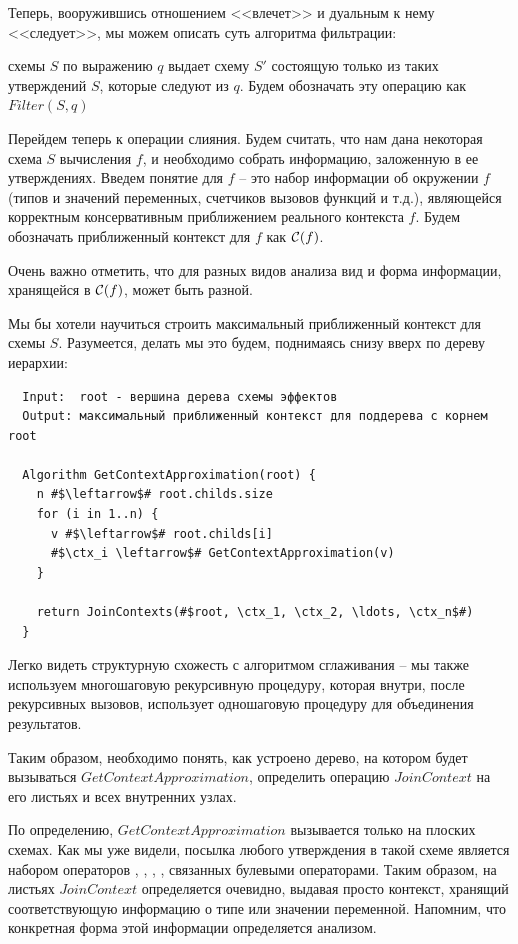 Теперь, вооружившись отношением <<влечет>> и дуальным к нему <<следует>>, мы можем описать суть алгоритма фильтрации:

\begin{definition}
     схемы $S$ по выражению $q$ выдает схему $S'$ состоящую только из таких утверждений $S$, которые следуют из $q$. Будем обозначать эту операцию как $Filter(S, q)$
\end{definition}


\bigskip

Перейдем теперь к операции слияния. Будем считать, что нам дана некоторая схема $S$ вычисления $f$, и необходимо собрать информацию, заложенную в ее утверждениях. Введем понятие  для $f$ -- это набор информации об окружении $f$ (типов и значений переменных, счетчиков вызовов функций и т.д.), являющейся корректным консервативным приближением реального контекста $f$. Будем обозначать приближенный контекст для $f$ как $\mathcal{C}(f)$.

Очень важно отметить, что для разных видов анализа вид и форма информации, хранящейся в $\mathcal{C}(f)$, может быть разной.

Мы бы хотели научиться строить максимальный приближенный контекст для схемы $S$. Разумеется, делать мы это будем, поднимаясь снизу вверх по дереву иерархии:

\begin{verbatim}
  Input:  root - вершина дерева схемы эффектов
  Output: максимальный приближенный контекст для поддерева с корнем root

  Algorithm GetContextApproximation(root) {
    n #$\leftarrow$# root.childs.size
    for (i in 1..n) {
      v #$\leftarrow$# root.childs[i]
      #$\ctx_i \leftarrow$# GetContextApproximation(v)
    }

    return JoinContexts(#$root, \ctx_1, \ctx_2, \ldots, \ctx_n$#)
  }
\end{verbatim}

Легко видеть структурную схожесть с алгоритмом сглаживания -- мы также используем многошаговую рекурсивную процедуру, которая внутри, после рекурсивных вызовов, использует одношаговую процедуру для объединения результатов.

Таким образом, необходимо понять, как устроено дерево, на котором будет вызываться $GetContextApproximation$, определить операцию $JoinContext$ на его листьях и всех внутренних узлах.

По определению, $GetContextApproximation$ вызывается только на плоских схемах. Как мы уже видели, посылка любого утверждения в такой схеме является набором операторов , \code{==}, , \code{!=}, связанных булевыми операторами. Таким образом, на листьях $JoinContext$ определяется очевидно, выдавая просто контекст, хранящий соответствующую информацию о типе или значении переменной. Напомним, что конкретная форма этой информации определяется анализом.

